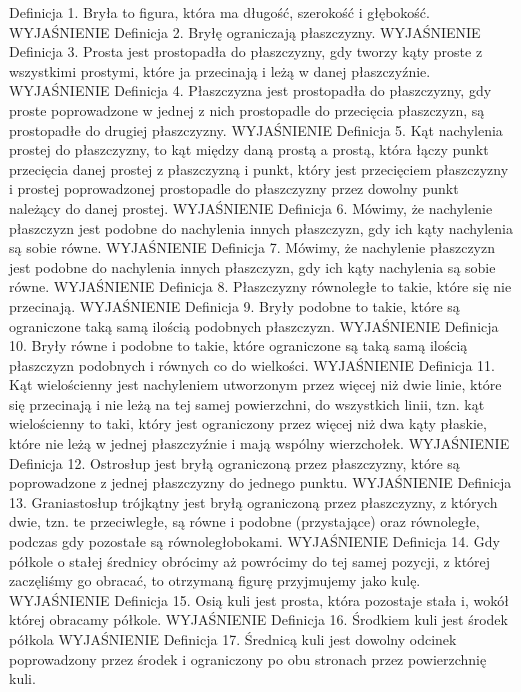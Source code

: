 Definicja 1.
    Bryła to figura, która ma długość, szerokość i głębokość. 
    WYJAŚNIENIE
Definicja 2.
    Bryłę ograniczają płaszczyzny.
    WYJAŚNIENIE
Definicja 3.
    Prosta jest prostopadła do płaszczyzny, gdy tworzy kąty proste z wszystkimi prostymi, które ja przecinają i leżą w danej płaszczyźnie.
    WYJAŚNIENIE
Definicja 4.
    Płaszczyzna jest prostopadła do płaszczyzny, gdy proste poprowadzone w jednej z nich prostopadle do przecięcia płaszczyzn, są prostopadłe do drugiej płaszczyzny.
    WYJAŚNIENIE
Definicja 5.
    Kąt nachylenia prostej do płaszczyzny, to kąt między daną prostą a prostą, która łączy punkt przecięcia danej prostej z płaszczyzną i punkt, który jest przecięciem płaszczyzny i prostej poprowadzonej prostopadle do płaszczyzny przez dowolny punkt należący do danej prostej.
    WYJAŚNIENIE
Definicja 6.
    Mówimy, że nachylenie płaszczyzn jest podobne do nachylenia innych płaszczyzn, gdy ich kąty nachylenia są sobie równe.
    WYJAŚNIENIE
Definicja 7.
    Mówimy, że nachylenie płaszczyzn jest podobne do nachylenia innych płaszczyzn, gdy ich kąty nachylenia są sobie równe.
    WYJAŚNIENIE
Definicja 8.
    Płaszczyzny równoległe to takie, które się nie przecinają.
    WYJAŚNIENIE
Definicja 9.
    Bryły podobne to takie, które są ograniczone taką samą ilością podobnych płaszczyzn.
    WYJAŚNIENIE
Definicja 10.
    Bryły równe i podobne to takie, które ograniczone są taką samą ilością płaszczyzn podobnych i równych co do wielkości.
    WYJAŚNIENIE
Definicja 11.
    Kąt wielościenny jest nachyleniem utworzonym przez więcej niż dwie linie, które się przecinają i nie leżą na tej samej powierzchni, do wszystkich linii, tzn. kąt wielościenny to taki, który jest ograniczony przez więcej niż dwa kąty płaskie, które nie leżą w jednej płaszczyźnie i mają wspólny wierzchołek.
    WYJAŚNIENIE
Definicja 12.
    Ostrosłup jest bryłą ograniczoną przez płaszczyzny, które są poprowadzone z jednej płaszczyzny do jednego punktu.
    WYJAŚNIENIE
Definicja 13.
    Graniastosłup trójkątny jest bryłą ograniczoną przez płaszczyzny, z których dwie, tzn. te przeciwległe, są równe i podobne (przystające) oraz równoległe, podczas gdy pozostałe są równoległobokami.
    WYJAŚNIENIE
Definicja 14.
    Gdy półkole o stałej średnicy obrócimy aż powrócimy do tej samej pozycji, z której zaczęliśmy go obracać, to otrzymaną figurę przyjmujemy jako kulę. 
    WYJAŚNIENIE
Definicja 15.
    Osią kuli jest prosta, która pozostaje stała i, wokół której obracamy półkole.
    WYJAŚNIENIE
Definicja 16.
    Środkiem kuli jest środek półkola
    WYJAŚNIENIE
Definicja 17.
    Średnicą kuli jest dowolny odcinek poprowadzony przez środek i ograniczony po obu stronach przez powierzchnię kuli.
